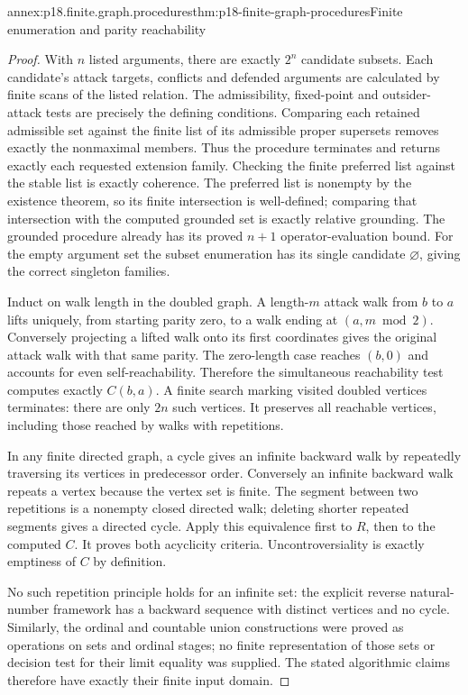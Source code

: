 \begin{annexitem}{annex:p18.finite.graph.procedures}{thm:p18-finite-graph-procedures}{Finite enumeration and parity reachability}
\begin{proof}
With \(n\) listed arguments,
there are exactly \(2^n\)
candidate subsets. Each
candidate's attack targets,
conflicts and defended
arguments are calculated
by finite scans of the
listed relation. The
admissibility, fixed-point
and outsider-attack tests
are precisely the defining
conditions. Comparing each
retained admissible set
against the finite list
of its admissible proper
supersets removes exactly
the nonmaximal members.
Thus the procedure
terminates and returns
exactly each requested
extension family.
Checking the finite
preferred list against
the stable list is
exactly coherence.
The preferred list is
nonempty by the
existence theorem, so
its finite intersection
is well-defined; comparing
that intersection with
the computed grounded
set is exactly relative
grounding.
The grounded procedure
already has its proved
\(n+1\) operator-evaluation
bound. For the empty
argument set the subset
enumeration has its
single candidate
\(\varnothing\), giving
the correct singleton
families.

Induct on walk length
in the doubled graph.
A length-\(m\) attack
walk from \(b\) to
\(a\) lifts uniquely,
from starting parity
zero, to a walk
ending at \((a,m\bmod2)\).
Conversely projecting
a lifted walk onto
its first coordinates
gives the original
attack walk with that
same parity. The
zero-length case
reaches \((b,0)\)
and accounts for
even self-reachability.
Therefore the simultaneous
reachability test computes
exactly \(C(b,a)\).
A finite search marking
visited doubled vertices
terminates: there are
only \(2n\) such
vertices. It preserves
all reachable vertices,
including those reached
by walks with repetitions.

In any finite directed
graph, a cycle gives
an infinite backward
walk by repeatedly
traversing its vertices
in predecessor order.
Conversely an infinite
backward walk repeats
a vertex because the
vertex set is finite.
The segment between
two repetitions is
a nonempty closed
directed walk; deleting
shorter repeated segments
gives a directed cycle.
Apply this equivalence
first to \(R\), then
to the computed \(C\).
It proves both
acyclicity criteria.
Uncontroversiality is
exactly emptiness of
\(C\) by definition.

No such repetition
principle holds for
an infinite set:
the explicit reverse
natural-number framework
has a backward sequence
with distinct vertices
and no cycle. Similarly,
the ordinal and countable
union constructions were
proved as operations
on sets and ordinal
stages; no finite
representation of those
sets or decision test
for their limit equality
was supplied. The
stated algorithmic
claims therefore have
exactly their finite
input domain.
\end{proof}
\end{annexitem}
